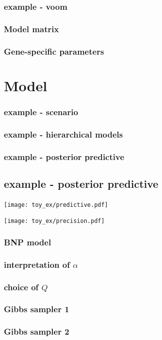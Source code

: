 \documentclass{beamer}
\begin{document}
\begin{frame}
\frametitle{example - voom}
\end{frame}

\begin{frame}
\frametitle{Model matrix}
\end{frame}

\begin{frame}
\frametitle{Gene-specific parameters}
\end{frame}
\section{Model}

\begin{frame}
\frametitle{example - scenario}
\end{frame}

\begin{frame}
\frametitle{example - hierarchical models}
\end{frame}

\begin{frame}
\frametitle{example - posterior predictive}
\end{frame}

\subsection{example - posterior predictive}
\begin{frame}
\centering
\texttt{[image: toy\_ex/predictive.pdf]}
\end{frame}

\begin{frame}
\texttt{[image: toy\_ex/precision.pdf]}
\end{frame}

\begin{frame}
\frametitle{BNP model}
\end{frame}

\begin{frame}
\frametitle{interpretation of $\alpha$}
\end{frame}

\begin{frame}
\frametitle{choice of $Q$}
\end{frame}

\begin{frame}
\frametitle{Gibbs sampler 1}
\end{frame}

\begin{frame}
\frametitle{Gibbs sampler 2}
\end{frame}
\end{document}
